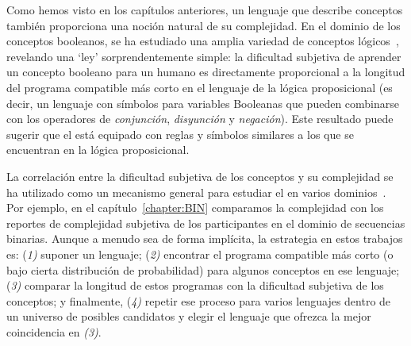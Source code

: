 
Como hemos visto en los capítulos anteriores, un lenguaje que describe conceptos también proporciona una noción natural de su complejidad. En el dominio de los conceptos booleanos, se ha estudiado una amplia variedad de conceptos lógicos~\cite{feldman2003simplicity}, revelando una `ley' sorprendentemente simple: la dificultad subjetiva de aprender un concepto booleano para un humano es directamente proporcional a la longitud del programa compatible más corto en el lenguaje de la lógica proposicional (es decir, un lenguaje con símbolos para variables Booleanas que pueden combinarse con los operadores de \textit{conjunción}, \textit{disyunción} y \textit{negación}). Este resultado puede sugerir que el \lot está equipado con reglas y símbolos similares a los que se encuentran en la lógica proposicional.

La correlación entre la dificultad subjetiva de los conceptos y su complejidad se ha utilizado como un mecanismo general para estudiar el \lot en varios dominios~\cite{piantadosi2016logical,leeuwenberg1971perceptual,amalric2017language,romano2018bayesian,lupyan2007language}. Por ejemplo, en el capítulo~\ref{chapter:BIN} comparamos la complejidad \mdlbin con los reportes de complejidad subjetiva de los participantes en el dominio de secuencias binarias.  Aunque a menudo sea de forma implícita, la estrategia en estos trabajos es: (\textit{1)} suponer un lenguaje; (\textit{2)} encontrar el programa compatible más corto (o bajo cierta distribución de probabilidad) para algunos conceptos en ese lenguaje; (\textit{3)} comparar la longitud de estos programas con la dificultad subjetiva de los conceptos; y finalmente, (\textit{4)} repetir ese proceso para varios lenguajes dentro de un universo de posibles candidatos y elegir el lenguaje que ofrezca la mejor coincidencia en \textit{(3)}. 


